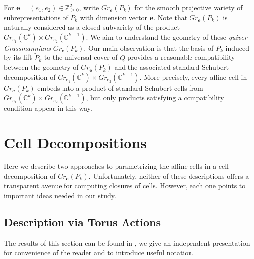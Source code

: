 \documentclass{amsart}
\numberwithin{equation}{section}
\newcommand{\CC}{\mathbb{C}}
\newcommand{\ZZ}{\mathbb{Z}}
\newcommand{\bfe}{\mathbf{e}}
\begin{document}
  For $\bfe=(e_1,e_2)\in\ZZ_{\ge0}^2$, write $Gr_\bfe(P_k)$ for the smooth projective variety of subrepresentations of $P_k$ with dimension vector $\bfe$.
  Note that $Gr_\bfe(P_k)$ is naturally considered as a closed subvariety of the product $Gr_{e_1}(\CC^k)\times Gr_{e_2}(\CC^{k-1})$.
  We aim to understand the geometry of these \emph{quiver Grassmannians} $Gr_\bfe(P_k)$.
  Our main observation is that the basis of $P_k$ induced by its lift $\widetilde P_k$ to the universal cover of $Q$ provides a reasonable compatibility between the geometry of $Gr_\bfe(P_k)$ and the associated standard Schubert decomposition of $Gr_{e_1}(\CC^k)\times Gr_{e_2}(\CC^{k-1})$.
  More precisely, every affine cell in $Gr_\bfe(P_k)$ embeds into a product of standard Schubert cells from $Gr_{e_1}(\CC^k)\times Gr_{e_2}(\CC^{k-1})$, but only products satisfying a compatibility condition appear in this way.

\section{Cell Decompositions}
  Here we describe two approaches to parametrizing the affine cells in a cell decomposition of $Gr_\bfe(P_k)$.
  Unfortunately, neither of these descriptions offers a transparent avenue for computing closures of cells.
  However, each one points to important ideas needed in our study.

  \subsection{Description via Torus Actions}
    The results of this section can be found in \cite{cerulli irelli-esposito}, we give an independent presentation for convenience of the reader and to introduce useful notation.
 
\end{document}
